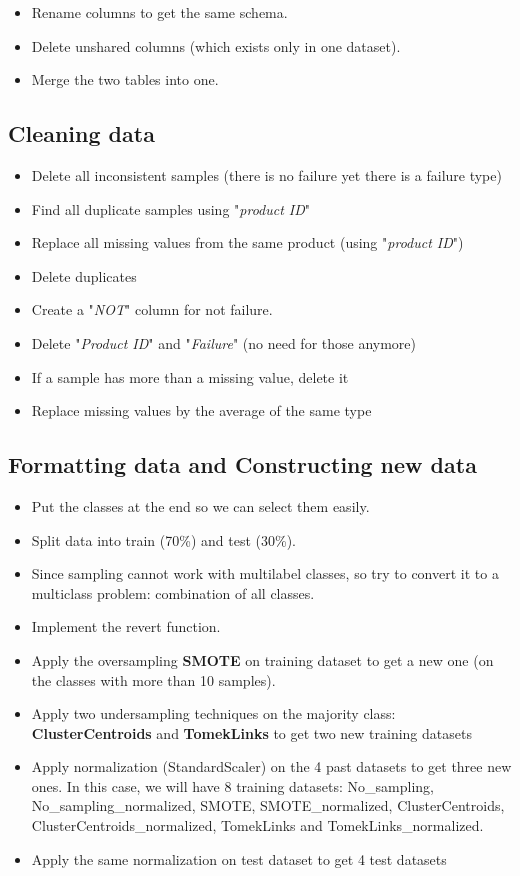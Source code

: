 \documentclass[11pt, a4paper]{article}
\begin{document}
\begin{multicols}{2}
\begin{itemize}
	\item Rename columns to get the same schema.
	\item Delete unshared columns (which exists only in one dataset).
	\item Merge the two tables into one.
\end{itemize}

\subsection{Cleaning data}

\begin{itemize}
	\item Delete all inconsistent samples (there is no failure yet there is a failure type)
	\item Find all duplicate samples using "\textit{product ID}"
	\item Replace all missing values from the same product (using "\textit{product ID}")
	\item Delete duplicates
	\item Create a "\textit{NOT}" column for not failure. 
	\item Delete "\textit{Product ID}" and "\textit{Failure}" (no need for those anymore)
	\item If a sample has more than a missing value, delete it
	\item Replace missing values by the average of the same type
\end{itemize}

\subsection{Formatting data and Constructing new data}

\begin{itemize}
	\item Put the classes at the end so we can select them easily.
	\item Split data into train (70\%) and test (30\%).
	\item Since sampling cannot work with multilabel classes, so try to convert it to a multiclass problem: combination of all classes.
	\item Implement the revert function.
	\item Apply the oversampling \textbf{SMOTE} on training dataset to get a new one
	(on the classes with more than 10 samples).
	\item Apply two undersampling techniques on the majority class: \textbf{ClusterCentroids} and \textbf{TomekLinks} to get two new training datasets
	\item Apply normalization (StandardScaler) on the 4 past datasets to get three new ones.
	In this case, we will have 8 training datasets: No\_sampling, No\_sampling\_normalized, SMOTE, SMOTE\_normalized, ClusterCentroids, ClusterCentroids\_normalized, TomekLinks and TomekLinks\_normalized.
	\item  Apply the same normalization on test dataset to get 4 test datasets
\end{itemize}



\end{multicols}
\end{document}
